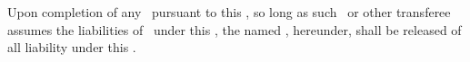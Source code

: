 Upon completion of any \permittedtransfer\ pursuant to this \amendmentTitle, so long as such \permittedtransfer\ or other transferee assumes the liabilities of \lessee\ under this \amendmentTitle, the named \lessee, hereunder, shall be released of all liability under this \amendmentTitle.
